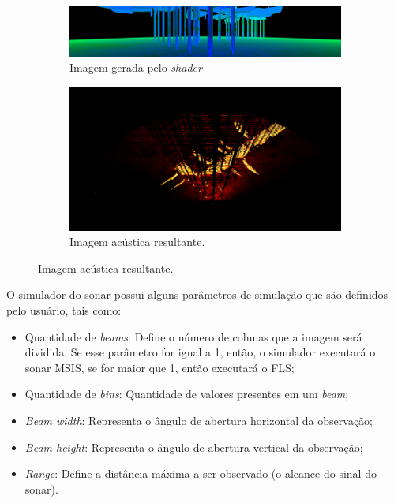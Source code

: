 \begin{figure}[H]
    \centering
    \caption{Imagens correspondentes geradas pelo \textit{GPU Sonar Simulator}}
    \label{fig:shader_output}
    \begin{subfigure}[t]{0.7\textwidth}
        \includegraphics[width=\textwidth]{dados/figuras/shader_output1.png}
        \caption{Imagem gerada pelo \textit{shader}}
    \end{subfigure}
    \begin{subfigure}[t]{0.7\textwidth}
        \includegraphics[width=\textwidth]{dados/figuras/shader_output2.png}
        \caption{Imagem acústica resultante.}
    \end{subfigure}
\end{figure}

O simulador do sonar possui alguns parâmetros de simulação que são definidos pelo usuário, tais como:

\begin{itemize}
    \item Quantidade de \textit{beams}: Define o número de colunas que a imagem será dividida. Se esse parâmetro for igual a 1, então, o simulador executará o sonar MSIS, se for maior que 1, então executará o FLS;
    \item Quantidade de \textit{bins}: Quantidade de valores presentes em um \textit{beam};
    \item \textit{Beam width}: Representa o ângulo de abertura horizontal da observação;
    \item \textit{Beam height}: Representa o ângulo de abertura vertical da observação;
    \item \textit{Range}: Define a distância máxima a ser observado (o alcance do sinal do sonar).
\end{itemize}
\hspace{1em}

